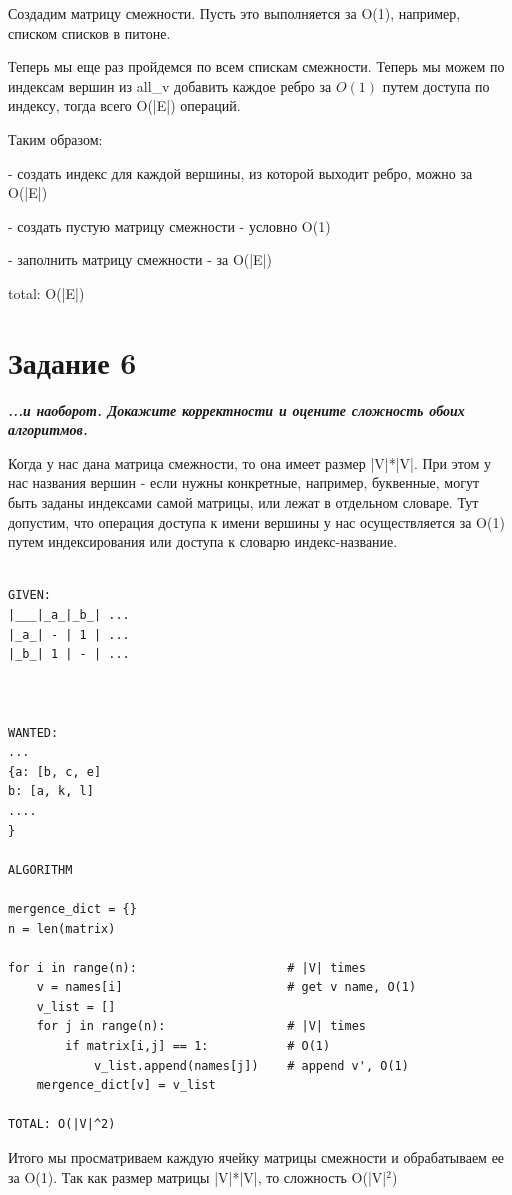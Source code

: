 \documentclass{article}
\begin{document}
Создадим матрицу смежности. Пусть это выполняется за O(1), например, списком списков в питоне.

Теперь мы еще раз пройдемся по всем спискам смежности. Теперь мы можем по индексам вершин из all\_v добавить каждое ребро за $O(1)$ путем доступа по индексу, тогда всего O(|E|) операций.

Таким образом: 

- создать индекс для каждой вершины, из которой выходит ребро, можно за O(|E|)

- создать пустую матрицу смежности - условно O(1)

- заполнить матрицу смежности - за O(|E|)

total: O(|E|)
\bigskip

\section*{\textbf{Задание 6}} \textbf{\textit{...и наоборот. Докажите корректности и оцените сложность обоих алгоритмов.}}

Когда у нас дана матрица смежности, то она имеет размер |V|*|V|. При этом у нас названия вершин - если нужны конкретные, например, буквенные, могут быть заданы индексами самой матрицы, или лежат в отдельном словаре. Тут допустим, что операция доступа к имени вершины у нас осуществляется за O(1) путем индексирования или доступа к словарю индекс-название. 

\begin{verbatim}

GIVEN: 
|___|_a_|_b_| ...
|_a_| - | 1 | ...
|_b_| 1 | - | ...



WANTED:
...
{a: [b, c, e]
b: [a, k, l]
....
}

ALGORITHM

mergence_dict = {}
n = len(matrix)

for i in range(n):                     # |V| times
    v = names[i]                       # get v name, O(1)
    v_list = []
    for j in range(n):                 # |V| times
        if matrix[i,j] == 1:           # O(1)
            v_list.append(names[j])    # append v', O(1)
    mergence_dict[v] = v_list
        
TOTAL: O(|V|^2)
\end{verbatim}

Итого мы просматриваем каждую ячейку матрицы смежности и обрабатываем ее за O(1). Так как размер матрицы |V|*|V|, то сложность O(|V|$^2$)

\bigskip
\end{document}
